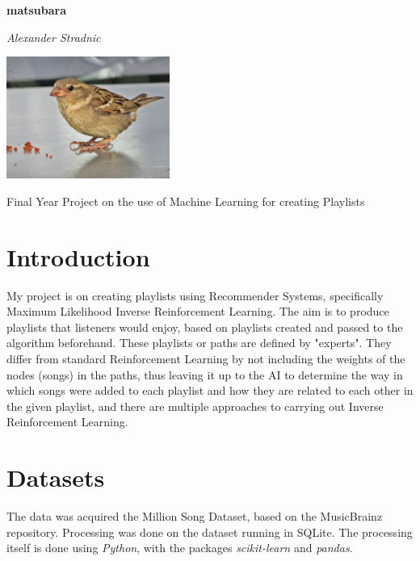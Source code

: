 \documentclass[a4paper, 12pt]{article}
\begin{document}
\begin{titlepage}
   \begin{center}
       \vspace*{1cm}

       \huge
       \textbf{matsubara}

       \vspace{1cm}

       \textit{Alexander Stradnic}

        \vspace{3cm}

       \includegraphics[width=0.4\textwidth]{"logo.jpg"}

       \vfill

       \textsf{Final Year Project on the use of Machine Learning for creating Playlists}


       \vspace*{1cm}


   \end{center}
\end{titlepage}

\section{Introduction}
My project is on creating playlists using Recommender Systems, specifically Maximum Likelihood Inverse Reinforcement Learning.
The aim is to produce playlists that listeners would enjoy, based on playlists created and passed to the algorithm beforehand.
These playlists or paths are defined by "experts".
They differ from standard Reinforcement Learning by not including the weights of the nodes (songs) in the paths, thus leaving it up to the AI to determine the way in which songs were added to each playlist and how they are related to each other in the given playlist, and there are multiple approaches to carrying out Inverse Reinforcement Learning.

\section{Datasets}
The data was acquired the Million Song Dataset, based on the MusicBrainz repository.
Processing was done on the dataset running in SQLite.
The processing itself is done using \emph{Python}, with the packages \emph{scikit-learn} and \emph{pandas}.
\end{document}
